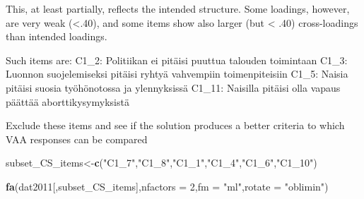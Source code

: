 \documentclass[
]{article}
\newenvironment{Shaded}{\begin{snugshade}}{\end{snugshade}}
\newcommand{\DataTypeTok}[1]{\textcolor[rgb]{0.13,0.29,0.53}{#1}}
\newcommand{\DecValTok}[1]{\textcolor[rgb]{0.00,0.00,0.81}{#1}}
\newcommand{\KeywordTok}[1]{\textcolor[rgb]{0.13,0.29,0.53}{\textbf{#1}}}
\newcommand{\NormalTok}[1]{#1}
\newcommand{\StringTok}[1]{\textcolor[rgb]{0.31,0.60,0.02}{#1}}
\begin{document}
This, at least partially, reflects the intended structure. Some
loadings, however, are very weak (\textless.40), and some items show
also larger (but \textless{} .40) cross-loadings than intended loadings.

Such items are: C1\_2: Politiikan ei pitäisi puuttua talouden toimintaan
C1\_3: Luonnon suojelemiseksi pitäisi ryhtyä vahvempiin toimenpiteisiin
C1\_5: Naisia pitäisi suosia työhönotossa ja ylennyksissä C1\_11:
Naisilla pitäisi olla vapaus päättää aborttikysymyksistä

Exclude these items and see if the solution produces a better criteria
to which VAA responses can be compared

\begin{Shaded}
\begin{Highlighting}[]
\NormalTok{subset_CS_items<-}\KeywordTok{c}\NormalTok{(}\StringTok{"C1_7"}\NormalTok{,}\StringTok{"C1_8"}\NormalTok{,}\StringTok{"C1_1"}\NormalTok{,}\StringTok{"C1_4"}\NormalTok{,}\StringTok{"C1_6"}\NormalTok{,}\StringTok{"C1_10"}\NormalTok{)}

\KeywordTok{fa}\NormalTok{(dat2011[,subset_CS_items],}\DataTypeTok{nfactors =} \DecValTok{2}\NormalTok{,}\DataTypeTok{fm =} \StringTok{"ml"}\NormalTok{,}\DataTypeTok{rotate =} \StringTok{"oblimin"}\NormalTok{)}
\end{Highlighting}
\end{Shaded}
\end{document}

